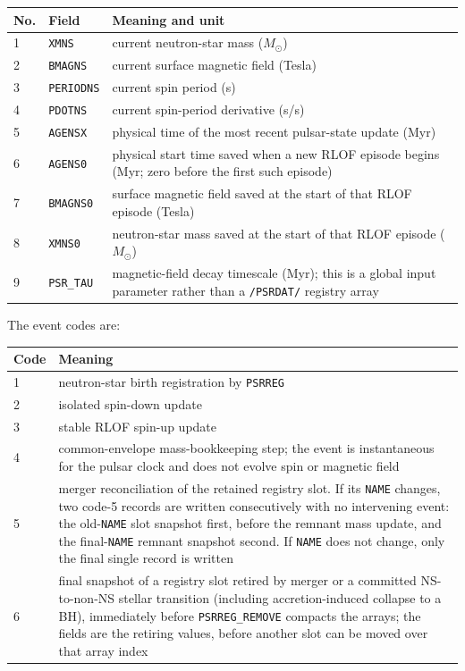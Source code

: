 \begin{longtable}{@{}p{0.8cm} p{2.5cm} p{10.5cm}}
\hline
No. & Field & Meaning and unit \\\hline
1 & \texttt{XMNS} & current neutron-star mass ($M_\odot$) \\
2 & \texttt{BMAGNS} & current surface magnetic field (Tesla) \\
3 & \texttt{PERIODNS} & current spin period (s) \\
4 & \texttt{PDOTNS} & current spin-period derivative (s/s) \\
5 & \texttt{AGENSX} & physical time of the most recent pulsar-state update (Myr) \\
6 & \texttt{AGENS0} & physical start time saved when a new RLOF episode begins (Myr; zero before the first such episode) \\
7 & \texttt{BMAGNS0} & surface magnetic field saved at the start of that RLOF episode (Tesla) \\
8 & \texttt{XMNS0} & neutron-star mass saved at the start of that RLOF episode ($M_\odot$) \\
9 & \texttt{PSR\_TAU} & magnetic-field decay timescale (Myr); this is a global input parameter rather than a \texttt{/PSRDAT/} registry array \\
\hline
\end{longtable}

The event codes are:

\begin{longtable}{@{}p{0.8cm} p{13.0cm}}
\hline
Code & Meaning \\\hline
1 & neutron-star birth registration by \texttt{PSRREG} \\
2 & isolated spin-down update \\
3 & stable RLOF spin-up update \\
4 & common-envelope mass-bookkeeping step; the event is instantaneous for the pulsar clock and does not evolve spin or magnetic field \\
5 & merger reconciliation of the retained registry slot. If its \texttt{NAME} changes, two code-5 records are written consecutively with no intervening event: the old-\texttt{NAME} slot snapshot first, before the remnant mass update, and the final-\texttt{NAME} remnant snapshot second. If \texttt{NAME} does not change, only the final single record is written \\
6 & final snapshot of a registry slot retired by merger or a committed NS-to-non-NS stellar transition (including accretion-induced collapse to a BH), immediately before \texttt{PSRREG\_REMOVE} compacts the arrays; the fields are the retiring values, before another slot can be moved over that array index \\
\hline
\end{longtable}


